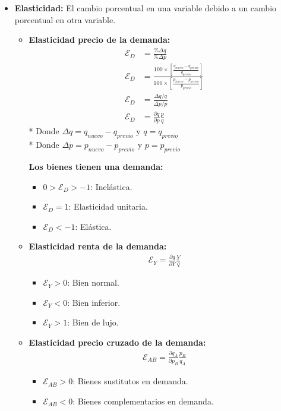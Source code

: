 \documentclass{templateNote}
\begin{document}
\begin{itemize}
    \newpage
    \item \textbf{Elasticidad:} El cambio porcentual en una variable debido a un cambio porcentual en
    otra variable.
    \begin{itemize}
        \item \textbf{Elasticidad precio de la demanda:}
        \begin{align*}
            \mathcal{E}_D &= \frac{\%\Delta q}{\%\Delta p} \\
            \mathcal{E}_D &= \displaystyle \frac{100 \times \left[\frac{q_{nuevo} - q_{previo}}{q_{previo}}\right]}{100 \times \left[\frac{p_{nuevo} - p_{previo}}{p_{previo}}\right]} \\
            \mathcal{E}_D &= \frac{\Delta q/q}{\Delta p/p} \\
            \mathcal{E}_D &= \frac{\partial q}{\partial p} \frac{p}{q}
        \end{align*}
        * Donde $\Delta q = q_{nuevo} - q_{previo}$ y $q = q_{previo}$ \\
        * Donde $\Delta p = p_{nuevo} - p_{previo}$ y $p = p_{previo}$

        \textbf{Los bienes tienen una demanda:}
        \begin{itemize}
            \item $ 0 > \mathcal{E}_D > -1$: Inelástica.
            \item $ \mathcal{E}_D = 1$: Elasticidad unitaria.
            \item $ \mathcal{E}_D < -1$: Elástica.
        \end{itemize}

        \item \textbf{Elasticidad renta de la demanda:}
        \begin{align*}
            \mathcal{E}_Y = \frac{\partial q}{\partial Y} \frac{Y}{q}
        \end{align*}
        \begin{itemize}
            \item $ \mathcal{E}_Y > 0 $: Bien normal.
            \item $ \mathcal{E}_Y < 0 $: Bien inferior.
            \item $ \mathcal{E}_Y > 1 $: Bien de lujo.
        \end{itemize}

        \item \textbf{Elasticidad precio cruzado de la demanda:}
        \begin{align*}
            \mathcal{E}_{AB} = \frac{\partial q_A}{\partial p_B} \frac{p_B}{q_A}
        \end{align*}
        \begin{itemize}
            \item $ \mathcal{E}_{AB} > 0 $: Bienes sustitutos en demanda.
            \item $ \mathcal{E}_{AB} < 0 $: Bienes complementarios en demanda.
        \end{itemize}


\end{itemize}
\end{itemize}
\end{document}
